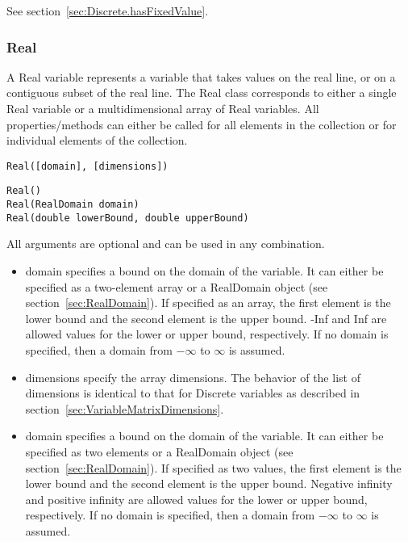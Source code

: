 

See section~\ref{sec:Discrete.hasFixedValue}.


\subsubsection{Real}

A Real variable represents a variable that takes values on the real line, or on a contiguous subset of the real line.  \ifmatlab The Real class corresponds to either a single Real variable or a multidimensional array of Real variables.  All properties/methods can either be called for all elements in the collection or for individual elements of the collection.  \fi


\ifmatlab
\begin{lstlisting}
Real([domain], [dimensions])
\end{lstlisting}
\fi

\ifjava
\begin{lstlisting}
Real()
Real(RealDomain domain)
Real(double lowerBound, double upperBound)
\end{lstlisting}
\fi

\ifmatlab
All arguments are optional and can be used in any combination.

\begin{itemize}
\item domain specifies a bound on the domain of the variable. It can either be specified as a two-element array or a RealDomain object (see section~\ref{sec:RealDomain}).  If specified as an array, the first element is the lower bound and the second element is the upper bound. -Inf and Inf are allowed values for the lower or upper bound, respectively.  If no domain is specified, then a domain from $-\infty$ to $\infty$ is assumed.
\item dimensions specify the array dimensions.  The behavior of the list of dimensions is identical to that for Discrete variables as described in section~\ref{sec:VariableMatrixDimensions}.
\end{itemize}
\fi

\ifjava
\begin{itemize}
\item domain specifies a bound on the domain of the variable. It can either be specified as two elements or a RealDomain object (see section~\ref{sec:RealDomain}).  If specified as two values, the first element is the lower bound and the second element is the upper bound. Negative infinity and positive infinity are allowed values for the lower or upper bound, respectively.  If no domain is specified, then a domain from $-\infty$ to $\infty$ is assumed.
\end{itemize}
\fi


